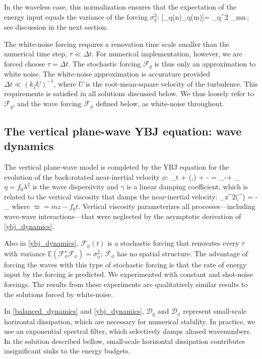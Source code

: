 \documentclass[12pt]{article}
\newcommand{\F}{\mathcal{F}}
\newcommand{\D}{\mathcal{D}}
\newcommand{\phis}{\phi^\star}
\newcommand{\Hf}{\boldsymbol{\mathcal{H}}}
\newcommand{\disp}{\eta}
\newcommand{\ze}{\zeta}
\newcommand{\Es}{\mathbb{E}}
\newcommand{\p}{\partial}
\begin{document}
In the waveless case, this normalization ensures that
the expectation of the energy input equals the variance of the forcing $\sigma_q^2$:
\beq
\Es[\xi_q(n)\xi_q(m)]= \sigma_q^2 \tau \delta_{mn}\,;
\eeq
see discussion in the next section.

The white-noise forcing requires a renovation time scale smaller than
the numerical time step, $\tau \ll \Delta t$. For numerical implementation,
however, we are forced choose $\tau = \Delta t$. The stochastic forcing $\F_q$
is thus only an approximation to white noise. The white-noise approximation is
accurature provided $\Delta t \ll (k_f U)^{-1}$, where $U$ is the root-mean-square
velocity of the turbulence. This requirements is satisfied in all solutions discussed
below. We thus loosely refer to $\F_q$, and
the wave forcing $\F_\phi$ defined below, as white-noise throughout.


\subsection{The vertical plane-wave YBJ equation: wave dynamics}
The vertical plane-wave model is completed by the YBJ equation for the evolution
of the back-rotated near-inertial velocity $\phi$:
\beq
\phi_t + \sJ(\psi,\phi) +  \phi {}\ze -  \disp \lap \phi
 = \F_\phi -\gamma \phi + \D_\phi\com
 \label{ybj_dynamics}
\eeq
$\eta = f_0\lambda^2$ is the wave dispersivity and  $\gamma$
is a linear damping coefficient, which is related to the vertical viscosity
that damps the near-inertial velocity:
\beq
\nu \p_z^2(\phi \ee^{\ii \varpi}) = - _{ \gamma}\phi\com
\eeq
where $\varpi = mz - f_0 t$. Vertical viscosity parameterizes
all processes---including wave-wave interactions---that were neglected by the
asymptotic derivation of \eqref{ybj_dynamics}.

Also in \eqref{ybj_dynamics}, $\F_\phi(t)$ is a stochastic forcing that renovates
every $\tau$ with variance $\Es(\F_\phis\F_\phi) = \sigma_\phi^2$; $\F_\phi$ has
no spatial structure. The advantage of forcing the waves with this type of stochastic
forcing is that the rate of energy input by the forcing is predicted. We experimented
with constant and shot-noise forcings. The results from these experiments are
 qualitatively similar results to the solutions forced by white-noise.

In \eqref{balanced_dynamics} and \eqref{ybj_dynamics}, $\D_q$ and $\D_{\phi}$ represent
small-scale horizontal dissipation, which are necessary for numerical stability.
In practice, we use an exponential spectral filter, which selectively damps aliased
wavenumbers. In the solution described bellow, small-scale horizontal dissipation contributes
insignificant sinks to the energy budgets.
\end{document}
